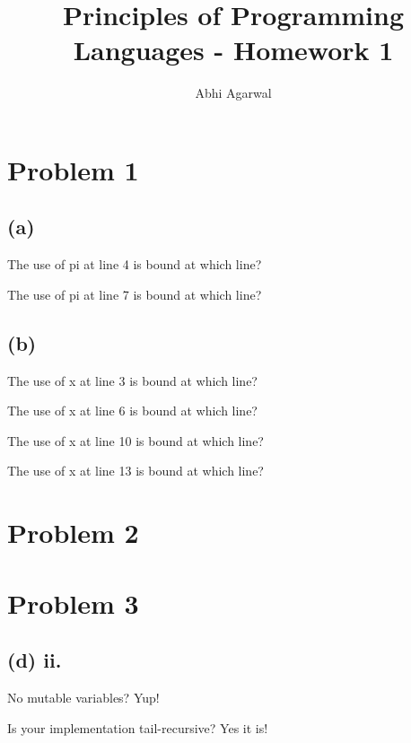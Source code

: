 \documentclass[11pt, oneside]{article}
\title{Principles of Programming Languages - Homework 1}
\author{Abhi Agarwal}
\date{}
\newcommand{\forceindent}{\leavevmode{\parindent=1.5em\indent}}
\begin{document}
\maketitle
\section{Problem 1}

\subsection*{(a)}
\forceindent The use of pi at line 4 is bound at which line?
\par The use of pi at line 7 is bound at which line?

\subsection*{(b)}
\forceindent The use of x at line 3 is bound at which line?
\par The use of x at line 6 is bound at which line?
\par The use of x at line 10 is bound at which line?
\par The use of x at line 13 is bound at which line?

\section{Problem 2}
\par

\section{Problem 3}

\subsection*{(d) ii.}
\forceindent No mutable variables? Yup!
\par Is your implementation tail-recursive? Yes it is!
\end{document}
